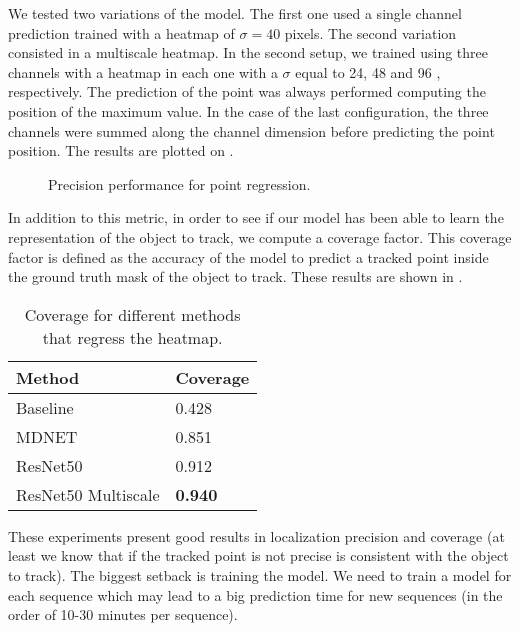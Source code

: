 We tested two variations of the model.
The first one used a single channel prediction trained with a heatmap of $\sigma = 40$ pixels.
The second variation consisted in a multiscale heatmap.
In the second setup, we trained using three channels with a heatmap in each one with a $\sigma$ equal to 24, 48 and 96 , respectively.
The prediction of the point was always performed computing the position of the maximum value.
In the case of the last configuration, the three channels were summed along the channel dimension before predicting the point position.
The results are plotted on .

\begin{figure}[h]
	\centering
	
	\caption{Precision performance for point regression.}
  \label{fig:tracking_point_regression}
\end{figure}

In addition to this metric, in order to see if our model has been able to learn the representation of the object to track, we compute a coverage factor.
This coverage factor is defined as the accuracy of the model to predict a tracked point inside the ground truth mask of the object to track.
These results are shown in .

\begin{table}[h]
  \centering
  \begin{tabular}{l|l}
    \toprule
    Method              & Coverage       \\
    \midrule
    Baseline            & 0.428          \\
    MDNET               & 0.851          \\
    ResNet50            & 0.912          \\
    ResNet50 Multiscale & \textbf{0.940} \\
    \bottomrule
  \end{tabular}
  \caption{Coverage for different methods that regress the heatmap. }
  \label{tab:coverage_tracking_heatmap}
\end{table}

These experiments present good results in localization precision and coverage (at least we know that if the tracked point is not precise is consistent with the object to track).
The biggest setback is training the model.
We need to train a model for each sequence which may lead to a big prediction time for new sequences (in the order of 10-30 minutes per sequence).

